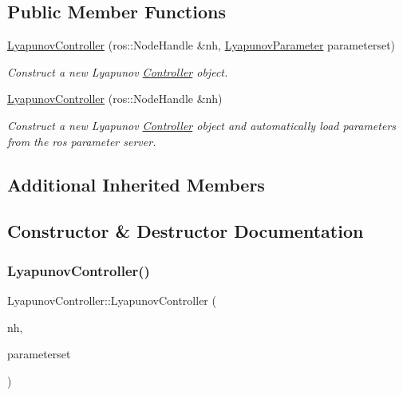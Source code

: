 \subsection*{Public Member Functions}
\begin{DoxyCompactItemize}
\item 
\hyperlink{classLyapunovController_a3b17565509b8e085861a85146738766f}{Lyapunov\+Controller} (ros\+::\+Node\+Handle \&nh, \hyperlink{structLyapunovController_1_1LyapunovParameter}{Lyapunov\+Parameter} parameterset)
\begin{DoxyCompactList}\small\item\em Construct a new Lyapunov \hyperlink{classController}{Controller} object. \end{DoxyCompactList}\item 
\hyperlink{classLyapunovController_a2812acc6b131e59ac0fc9b0633038999}{Lyapunov\+Controller} (ros\+::\+Node\+Handle \&nh)
\begin{DoxyCompactList}\small\item\em Construct a new Lyapunov \hyperlink{classController}{Controller} object and automatically load parameters from the ros parameter server. \end{DoxyCompactList}\end{DoxyCompactItemize}
\subsection*{Additional Inherited Members}


\subsection{Constructor \& Destructor Documentation}
\mbox{\label{classLyapunovController_a3b17565509b8e085861a85146738766f}} 
\subsubsection{\texorpdfstring{Lyapunov\+Controller()}{LyapunovController()}\hspace{0.1cm}{\footnotesize\ttfamily [1/2]}}
{\footnotesize\ttfamily Lyapunov\+Controller\+::\+Lyapunov\+Controller (\begin{DoxyParamCaption}\item[{ros\+::\+Node\+Handle \&}]{nh,  }\item[{\hyperlink{structLyapunovController_1_1LyapunovParameter}{Lyapunov\+Parameter}}]{parameterset }\end{DoxyParamCaption})}


